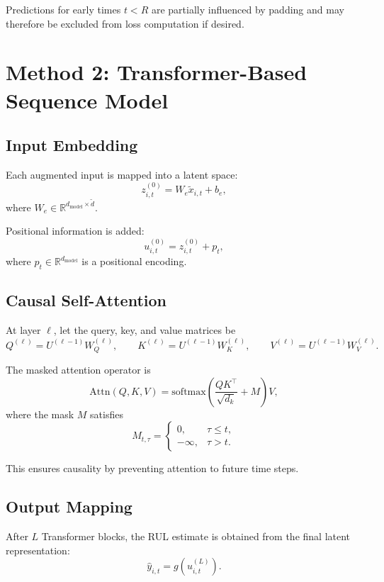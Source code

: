 \documentclass[11pt,a4paper]{article}
\begin{document}
Predictions for early times $t < R$ are partially influenced by padding and may therefore be excluded from loss computation if desired.

\section{Method 2: Transformer-Based Sequence Model}
\subsection{Input Embedding}
Each augmented input is mapped into a latent space:
\begin{equation}
    z_{i,t}^{(0)} = W_e \tilde{x}_{i,t} + b_e,
\end{equation}
where $W_e \in \mathbb{R}^{d_{\mathrm{model}} \times \tilde d}$.

Positional information is added:
\begin{equation}
    u_{i,t}^{(0)} = z_{i,t}^{(0)} + p_t,
\end{equation}
where $p_t \in \mathbb{R}^{d_{\mathrm{model}}}$ is a positional encoding.

\subsection{Causal Self-Attention}
At layer $\ell$, let the query, key, and value matrices be
\begin{equation}
    Q^{(\ell)} = U^{(\ell-1)}W_Q^{(\ell)}, \qquad
    K^{(\ell)} = U^{(\ell-1)}W_K^{(\ell)}, \qquad
    V^{(\ell)} = U^{(\ell-1)}W_V^{(\ell)}.
\end{equation}

The masked attention operator is
\begin{equation}
    \mathrm{Attn}(Q,K,V) =
    \mathrm{softmax}\left(
        \frac{QK^\top}{\sqrt{d_k}} + M
    \right)V,
\end{equation}
where the mask $M$ satisfies
\begin{equation}
    M_{t,\tau} =
    \begin{cases}
        0, & \tau \leq t,\\
        -\infty, & \tau > t.
    \end{cases}
\end{equation}

This ensures causality by preventing attention to future time steps.

\subsection{Output Mapping}
After $L$ Transformer blocks, the RUL estimate is obtained from the final latent representation:
\begin{equation}
    \hat{y}_{i,t} = g(u_{i,t}^{(L)}).
\end{equation}
\end{document}
